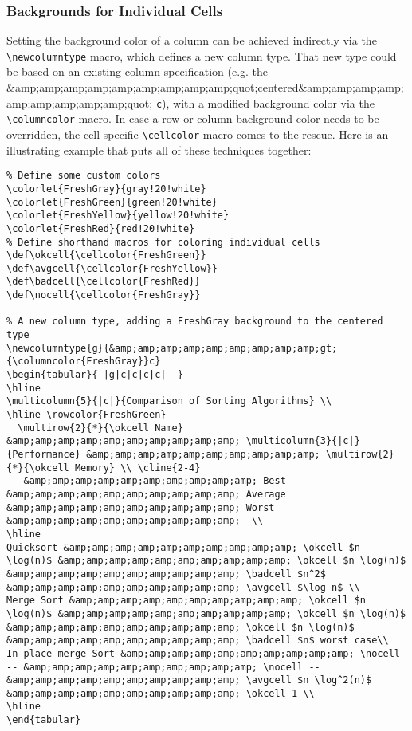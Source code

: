 \subsubsection{Backgrounds for Individual Cells}

Setting the background color of a column can be achieved indirectly via the \verb|\newcolumntype| macro, which defines a new column type. That new type could be based on an existing column specification (e.g. the &amp;amp;amp;amp;amp;amp;amp;amp;amp;quot;centered&amp;amp;amp;amp;amp;amp;amp;amp;amp;quot; \verb|c|), with a modified background color via the \verb|\columncolor| macro. In case a row or column background color needs to be overridden, the cell-specific \verb|\cellcolor| macro comes to the rescue. Here is an illustrating example that puts all of these techniques together:

\begin{lstlisting}
% Define some custom colors
\colorlet{FreshGray}{gray!20!white}
\colorlet{FreshGreen}{green!20!white}
\colorlet{FreshYellow}{yellow!20!white}
\colorlet{FreshRed}{red!20!white}
% Define shorthand macros for coloring individual cells
\def\okcell{\cellcolor{FreshGreen}}
\def\avgcell{\cellcolor{FreshYellow}}
\def\badcell{\cellcolor{FreshRed}}
\def\nocell{\cellcolor{FreshGray}}

% A new column type, adding a FreshGray background to the centered type
\newcolumntype{g}{&amp;amp;amp;amp;amp;amp;amp;amp;amp;gt;{\columncolor{FreshGray}}c}
\begin{tabular}{ |g|c|c|c|c|  }
\hline
\multicolumn{5}{|c|}{Comparison of Sorting Algorithms} \\
\hline \rowcolor{FreshGreen} 
  \multirow{2}{*}{\okcell Name} &amp;amp;amp;amp;amp;amp;amp;amp;amp;amp; \multicolumn{3}{|c|}{Performance} &amp;amp;amp;amp;amp;amp;amp;amp;amp;amp; \multirow{2}{*}{\okcell Memory} \\ \cline{2-4}
   &amp;amp;amp;amp;amp;amp;amp;amp;amp;amp; Best &amp;amp;amp;amp;amp;amp;amp;amp;amp;amp; Average &amp;amp;amp;amp;amp;amp;amp;amp;amp;amp; Worst &amp;amp;amp;amp;amp;amp;amp;amp;amp;amp;  \\
\hline
Quicksort &amp;amp;amp;amp;amp;amp;amp;amp;amp;amp; \okcell $n \log(n)$ &amp;amp;amp;amp;amp;amp;amp;amp;amp;amp; \okcell $n \log(n)$ &amp;amp;amp;amp;amp;amp;amp;amp;amp;amp; \badcell $n^2$ &amp;amp;amp;amp;amp;amp;amp;amp;amp;amp; \avgcell $\log n$ \\
Merge Sort &amp;amp;amp;amp;amp;amp;amp;amp;amp;amp; \okcell $n \log(n)$ &amp;amp;amp;amp;amp;amp;amp;amp;amp;amp; \okcell $n \log(n)$ &amp;amp;amp;amp;amp;amp;amp;amp;amp;amp; \okcell $n \log(n)$ &amp;amp;amp;amp;amp;amp;amp;amp;amp;amp; \badcell $n$ worst case\\
In-place merge Sort &amp;amp;amp;amp;amp;amp;amp;amp;amp;amp; \nocell -- &amp;amp;amp;amp;amp;amp;amp;amp;amp;amp; \nocell -- &amp;amp;amp;amp;amp;amp;amp;amp;amp;amp; \avgcell $n \log^2(n)$ &amp;amp;amp;amp;amp;amp;amp;amp;amp;amp; \okcell 1 \\
\hline
\end{tabular}
\end{lstlisting}

